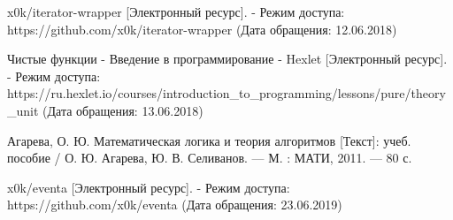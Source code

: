 \begin{thebibliography}{00}
  x0k/iterator-wrapper
  [Электронный ресурс]. - Режим доступа: https://github.com/x0k/iterator-wrapper
  (Дата обращения: 12.06.2018)

  Чистые функции - Введение в программирование - Hexlet
  [Электронный ресурс]. - Режим доступа: https://ru.hexlet.io/courses/introduction\_to\_programming/lessons/pure/theory \_unit
  (Дата обращения: 13.06.2018)

  Агарева, О. Ю.
  Математическая логика и теория алгоритмов
  [Текст]: учеб. пособие /
  О. Ю. Агарева, Ю. В. Селиванов. --- М. : МАТИ, 2011. — 80 с.

  x0k/eventa
  [Электронный ресурс]. - Режим доступа: https://github.com/x0k/eventa
  (Дата обращения: 23.06.2019)

\end{thebibliography}
\endgroup

\clearpage